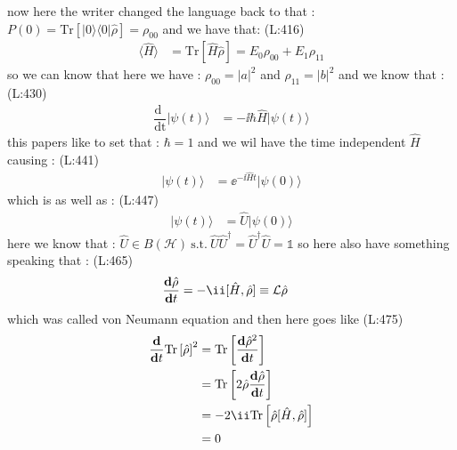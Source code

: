  now here the writer changed the language back to that : 
 $ P (0)=\text{Tr}\left[|0\rangle \langle 0|\hat{\rho }\right]=\rho _{00} $  and we have that:
(L:416)
\begin{equation}
\begin{split}
\langle \hat{H }\rangle &=\text{Tr}\left[\hat{H }\hat{\rho }\right]=E _{0}\rho _{00}+E _{1}\rho _{11}\end{split}
\end{equation}
 so we can know that here we have : 
 $ \rho _{00}=|a |^{2} $  and
 $ \rho _{11}=|b |^{2} $  and we know that : 
(L:430)
\begin{equation}
\begin{split}
\dfrac{\text{d }}{\text{dt}}|\psi (t )\rangle &=-\ii \hbar \hat{H }|\psi (t )\rangle \end{split}
\end{equation}
 this papers like to set that : 
 $ \hbar =1 $  and we wil have the time independent
 $ \hat{H } $  causing  : 
(L:441)
\begin{equation}
\begin{split}
|\psi (t )\rangle &=\ee ^{-\ii \hat{H }t }|\psi (0)\rangle \end{split}
\end{equation}
 which is as well as  :
(L:447)
\begin{equation}
\begin{split}
|\psi (t )\rangle &=\hat{U }|\psi (0)\rangle \end{split}
\end{equation}
 here we know that : 
 $ \hat{U }\in B (\mathcal{H })\ \text{s.t.}\ \hat{U }\hat{U }^\dagger =\hat{U }^\dagger \hat{U }=\mathds{1} $  so here also have something speaking that : 
(L:465)
\begin{equation}
\begin{split}
\dfrac{\bold{d}\hat{\rho }}{\bold{d}t }&=-\ii [\hat{H },\hat{\rho }]\equiv \mathcal{L }\hat{\rho }\end{split}
\end{equation}
 which was called von Neumann equation 
 and then here goes like 
(L:475)
\begin{equation}
\begin{split}
\dfrac{\bold{d}}{\bold{d}t }\text{Tr}\left[\hat{\rho }\right]^{2}&=\text{Tr}\left[\dfrac{\bold{d}\hat{\rho }^{2}}{\bold{d}t }\right]\\
&=\text{Tr}\left[2\hat{\rho }\dfrac{\bold{d}\hat{\rho }}{\bold{d}t }\right]\\
&=-2\ii \text{Tr}\left[\hat{\rho }[\hat{H },\hat{\rho }]\right]\\
&=0\end{split}
\end{equation}
